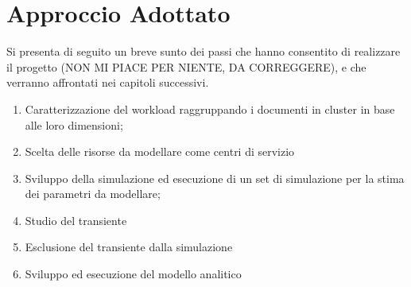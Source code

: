 \section{Approccio Adottato}
Si presenta di seguito un breve sunto dei passi che hanno consentito di realizzare il progetto (NON MI PIACE PER NIENTE, DA CORREGGERE), e che verranno affrontati nei capitoli successivi.
\begin{enumerate}
	\item Caratterizzazione del workload raggruppando i documenti in cluster in base alle loro dimensioni;
	\item Scelta delle risorse da modellare come centri di servizio
	\item Sviluppo della simulazione ed esecuzione di un set di simulazione per la stima dei parametri da modellare;
	\item Studio del transiente
	\item Esclusione del transiente dalla simulazione 
	\item Sviluppo ed esecuzione del modello analitico
\end{enumerate}

